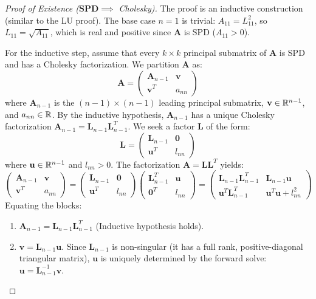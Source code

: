 \begin{proof}[Proof of Existence ($\mathbf{SPD} \implies$ Cholesky)]
The proof is an inductive construction (similar to the LU proof). The base case $n=1$ is trivial: $A_{11} = L_{11}^2$, so $L_{11} = \sqrt{A_{11}}$, which is real and positive since $\mathbf{A}$ is SPD ($A_{11} > 0$).

For the inductive step, assume that every $k \times k$ principal submatrix of $\mathbf{A}$ is SPD and has a Cholesky factorization. We partition $\mathbf{A}$ as:
\[ \mathbf{A} = \begin{pmatrix} \mathbf{A}_{n-1} & \mathbf{v} \\ \mathbf{v}^T & a_{nn} \end{pmatrix} \]
where $\mathbf{A}_{n-1}$ is the $(n-1) \times (n-1)$ leading principal submatrix, $\mathbf{v} \in \mathbb{R}^{n-1}$, and $a_{nn} \in \mathbb{R}$. By the inductive hypothesis, $\mathbf{A}_{n-1}$ has a unique Cholesky factorization $\mathbf{A}_{n-1} = \mathbf{L}_{n-1} \mathbf{L}_{n-1}^T$.
We seek a factor $\mathbf{L}$ of the form:
\[ \mathbf{L} = \begin{pmatrix} \mathbf{L}_{n-1} & \mathbf{0} \\ \mathbf{u}^T & l_{nn} \end{pmatrix} \]
where $\mathbf{u} \in \mathbb{R}^{n-1}$ and $l_{nn} > 0$. The factorization $\mathbf{A} = \mathbf{L}\mathbf{L}^T$ yields:
\[ \begin{pmatrix} \mathbf{A}_{n-1} & \mathbf{v} \\ \mathbf{v}^T & a_{nn} \end{pmatrix} = \begin{pmatrix} \mathbf{L}_{n-1} & \mathbf{0} \\ \mathbf{u}^T & l_{nn} \end{pmatrix} \begin{pmatrix} \mathbf{L}_{n-1}^T & \mathbf{u} \\ \mathbf{0}^T & l_{nn} \end{pmatrix} = \begin{pmatrix} \mathbf{L}_{n-1} \mathbf{L}_{n-1}^T & \mathbf{L}_{n-1} \mathbf{u} \\ \mathbf{u}^T \mathbf{L}_{n-1}^T & \mathbf{u}^T \mathbf{u} + l_{nn}^2 \end{pmatrix} \]
Equating the blocks:
\begin{enumerate}
    \item $\mathbf{A}_{n-1} = \mathbf{L}_{n-1} \mathbf{L}_{n-1}^T$ (Inductive hypothesis holds).
    \item $\mathbf{v} = \mathbf{L}_{n-1} \mathbf{u}$. Since $\mathbf{L}_{n-1}$ is non-singular (it has a full rank, positive-diagonal triangular matrix), $\mathbf{u}$ is uniquely determined by the forward solve: $\mathbf{u} = \mathbf{L}_{n-1}^{-1} \mathbf{v}$.

\end{enumerate}
\end{proof}
